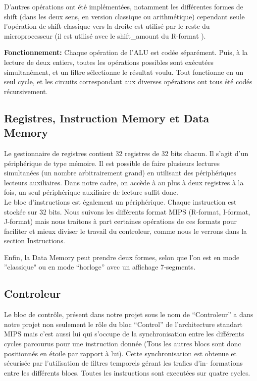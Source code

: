 \documentclass[13pt]{article}
\begin{document}
D'autres opérations ont été implémentées, notamment les différentes formes de shift 
(dans les deux sens, en version classique ou arithmétique) cependant seule l'opération
de shift classique vers la droite est utilisé par le reste du microprocesseur (il
est utilisé avec le shift\_amount du R-format ).

\textbf{Fonctionnement:} Chaque opération de l’ALU est codée séparément.
Puis, à la lecture de deux entiers, toutes les opérations possibles sont exécutées
simultanément, et un filtre sélectionne le résultat voulu. Tout fonctionne en un
seul cycle, et les circuits correspondant aux diverses opérations ont tous été
codés récursivement.

\subsection{Registres, Instruction Memory et Data Memory } 

Le gestionnaire de registres contient 32 registres de 32 bits chacun.
Il s'agit d'un périphérique de type mémoire. Il est possible de faire plusieurs
lectures simultanées (un nombre arbitrairement grand) en utilisant des périphériques
lecteurs auxiliaires. Dans notre cadre, on accède à au plus à deux registres à la fois, un seul 
périphérique auxiliaire de lecture suffit donc. \\

Le bloc d'instructions est également un périphérique. Chaque instruction est stockée
sur 32 bits. Nous suivons les différents format MIPS (R-format, I-format, J-format) mais
nous traitons à part certaines opérations de ces formats pour faciliter 
et mieux diviser le travail du 
controleur, comme nous le verrons dans la section Instructions.

Enfin, la Data Memory peut prendre deux formes, selon que l'on est en mode ''classique"
ou en mode ``horloge'' avec un affichage 7-segments. 

\subsection{Controleur}

Le bloc de contrôle, présent dans notre projet sous le nom de ``Controleur''
a dans notre projet non seulement le rôle du bloc ``Control'' de l’architecture
standart MIPS mais c’est aussi lui qui s’occupe de la synchronisation entre les
différents cycles parcourus pour une instruction donnée (Tous les autres blocs
sont donc positionnés en étoile par rapport à lui). Cette synchronisation est
obtenue et sécurisée par l’utilisation de filtres temporels gérant les trafics d’in-
formations entre les différents blocs. Toutes les instructions sont executées sur
quatre cycles.
\end{document}
